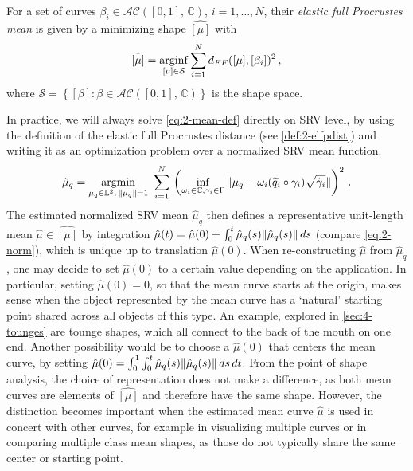 \begin{definition}
  \label{def:2-mean}
  For a set of curves $\beta_i \in \mathcal{AC}([0,1],\, \mathbb{C})$, $i = 1,\dots,N$,  their \emph{elastic full Procrustes mean} is given by a minimizing shape $\hat{[\mu]}$ with
  \begin{equation}
    \label{eq:2-mean-def}
    \hat{[\mu]} = \operatorname*{arginf}_{[\mu] \in \mathcal{S}} \sum_{i=1}^N d_{EF}([\mu], [\beta_i])^2\,,
  \end{equation}
  where $\mathcal{S} = \left\{ [\beta] : \beta \in \mathcal{AC}([0,1],\,\mathbb{C}) \right\}$ is the shape space.
\end{definition}

\noindent In practice, we will always solve \cref{eq:2-mean-def} directly on SRV level, by using the definition of the elastic full Procrustes distance (see \cref{def:2-elfpdist}) and writing it as an optimization problem over a normalized SRV mean function.
\begin{equation}
  \label{eq:2-mean-def-srv}
  \hat\mu_q = \operatorname*{argmin}_{\mu_q \in \mathbb{L}^2,\,\lVert\mu_q\rVert = 1}\,\,
  \sum_{i=1}^N \, \left( \inf_{\omega_i \in \mathbb{C}, \gamma_i \in \Gamma} \,
    \lVert\mu_q - \omega_i (\widetilde q_i \circ \gamma_i) \sqrt{\dot\gamma_i}\rVert \right)^2\,.
\end{equation}
The estimated normalized SRV mean $\hat{\mu}_q$ then defines a representative unit-length mean $\hat{\mu} \in \hat{[\mu]}$ by integration $\hat\mu(t) = \hat\mu(0) + \int_0^t \hat\mu_q(s) \lVert\hat\mu_q(s)\rVert\,ds$ (compare \cref{eq:2-norm}), which is unique up to translation $\hat\mu(0)$.
When re-constructing $\hat\mu$ from $\hat\mu_q$, one may decide to set $\hat\mu(0)$ to a certain value depending on the application.
In particular, setting $\hat\mu(0) = 0$, so that the mean curve starts at the origin, makes sense when the object represented by the mean curve has a \enquote*{natural} starting point shared across all objects of this type.
An example, explored in \cref{sec:4-tounges} are tounge shapes, which all connect to the back of the mouth on one end.
Another possibility would be to choose a $\hat\mu(0)$ that centers the mean curve, by setting $\hat\mu(0) = \int_0^1 \int_0^t \hat\mu_q(s) \lVert \hat\mu_q(s)\rVert\,ds\,dt$.
From the point of shape analysis, the choice of representation does not make a difference, as both mean curves are elements of $\hat{[\mu]}$ and therefore have the same shape.
However, the distinction becomes important when the estimated mean curve $\hat\mu$ is used in concert with other curves, for example in visualizing multiple curves or in comparing multiple class mean shapes, as those do not typically share the same center or starting point.

